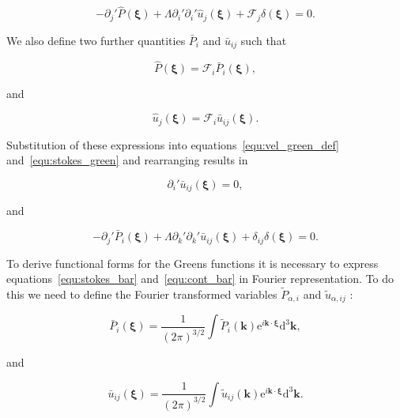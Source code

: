 \documentclass[12pt]{article}
\begin{document}
\begin{equation}
\label{equ:stokes_green}
-\partial_{j}' \hat{P}(\boldsymbol{\xi}) + \Lambda \partial_{i}' \partial_{i}' \hat{u}_{j}(\boldsymbol{\xi}) + \mathcal{F}_{j} \delta(\boldsymbol{\xi}) = 0 .
\end{equation}


We also define two further quantities $\bar{P}_{i}$ and $\bar{u}_{ij}$ such that

\begin{equation}
\label{equ:pres_bar}
\hat{P} (\boldsymbol{\xi}) = \mathcal{F}_{i} \bar{P}_{i} (\boldsymbol{\xi}) ,
\end{equation}

and 

\begin{equation}
\label{equ:vel_bar}
\hat{u}_{j}(\boldsymbol{\xi}) = \mathcal{F}_{i} \bar{u}_{ij} (\boldsymbol{\xi}) .
\end{equation}

Substitution of these expressions into equations~\ref{equ:vel_green_def} and~\ref{equ:stokes_green} and rearranging results in

\begin{equation}
\label{equ:cont_bar}
\partial_{i}' \bar{u}_{ij} (\boldsymbol\xi)  = 0 ,
\end{equation}

and

\begin{equation}
\label{equ:stokes_bar}
-\partial_{j}' \bar{P}_{i} (\boldsymbol\xi) + \Lambda \partial_{k}' \partial_{k}' \bar{u}_{ij} (\boldsymbol\xi) + \delta_{ij} \delta(\boldsymbol\xi) = 0 .
\end{equation}

To derive functional forms for the Greens functions it is necessary to express equations~\ref{equ:stokes_bar} and~\ref{equ:cont_bar} in Fourier representation. To do this we need to define the Fourier transformed variables $\tilde{P}_{\alpha, i}$ and $\tilde{u}_{\alpha,ij}$ \citep{Riley06}:

\begin{equation}
\label{equ:fourier_p}
\bar{P}_{i} (\boldsymbol\xi) = \frac{1}{(2 \pi)^{3/2}} \int \tilde{P}_{i} (\boldsymbol{k}) \mathrm{e}^{i \boldsymbol{k} \cdot \boldsymbol\xi} \mathrm{d}^{3} \boldsymbol{k} ,
\end{equation}

and 

\begin{equation}
\label{equ:fourier_vel}
\bar{u}_{ij} (\boldsymbol\xi) = \frac{1}{(2 \pi)^{3/2}} \int \tilde{u}_{ij} (\boldsymbol{k}) \mathrm{e}^{i \boldsymbol{k} \cdot \boldsymbol\xi} \mathrm{d}^{3} \boldsymbol{k} .
\end{equation}
\end{document}
